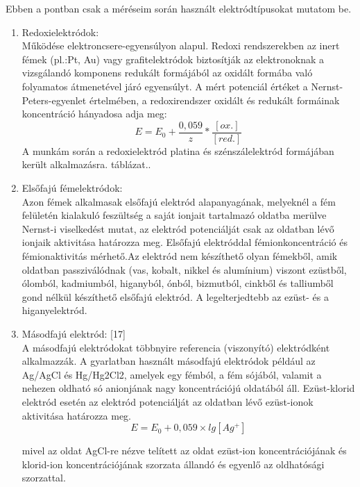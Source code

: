 Ebben a pontban csak a méréseim során használt elektródtípusokat mutatom be.
\begin{enumerate}
\item Redoxielektródok:\\
Működése elektroncsere-egyensúlyon alapul. Redoxi rendszerekben az inert fémek (pl.:Pt, Au) vagy grafitelektródok biztosítják az elektronoknak a vizsgálandó komponens redukált formájából az oxidált formába való folyamatos átmenetével járó egyensúlyt. A mért potenciál értéket a Nernst-Peters-egyenlet értelmében, a redoxirendszer oxidált és redukált formáinak koncentráció hányadosa adja meg:
\begin{equation}
E= E_\text{0} + \frac{0,059}{z} * \frac{[ox.]}{[red.]}
\end{equation}
A munkám során a redoxielektród platina és szénszálelektród formájában került alkalmazásra.
táblázat..
\item Elsőfajú fémelektródok:\\
Azon fémek alkalmasak elsőfajú elektród alapanyagának, melyeknél a  fém felületén kialakuló feszültség a saját ionjait tartalmazó oldatba merülve Nernst-i viselkedést mutat, az elektród potenciálját csak az oldatban lévő ionjaik aktivitása határozza meg. Elsőfajú elektróddal fémionkoncentráció és fémionaktivitás mérhető.Az elektród nem készíthető olyan fémekből, amik oldatban passziválódnak (vas, kobalt, nikkel és alumínium) viszont ezüstből, ólomból, kadmiumból, higanyból, ónból, bizmutból, cinkből és talliumből gond nélkül készíthető elsőfajú elektród. A legelterjedtebb az ezüst- és a higanyelektród.
\item Másodfajú elektród: [17]\\
A másodfajú elektródokat többnyire referencia (viszonyító) elektródként alkalmazzák. A gyarlatban használt másodfajú elektródok például az Ag/AgCl és Hg/Hg2Cl2, amelyek egy fémból, a fém sójából, valamit a nehezen oldható só anionjának nagy koncentrációjú oldatából áll. Ezüst-klorid elektród esetén az elektród potenciálját az oldatban lévő ezüst-ionok aktivitása határozza meg.\\

\begin{equation}
E = E_0 + 0,059 \times lg [Ag^+]
\end{equation}

mivel az oldat AgCl-re nézve telített az oldat ezüst-ion koncentrációjának és klorid-ion koncentrációjának szorzata állandó és egyenlő az oldhatósági szorzattal.\\


\end{enumerate}
